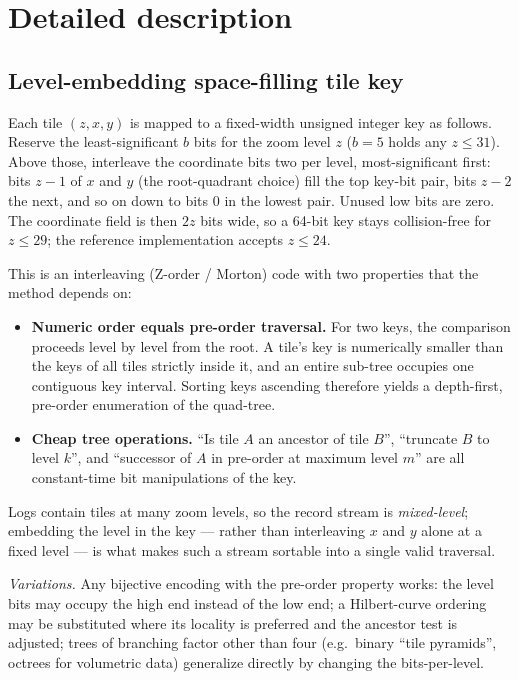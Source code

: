 \documentclass[10pt,twocolumn]{article}
\begin{document}
\section{Detailed description}

\subsection{Level-embedding space-filling tile key}

Each tile $(z, x, y)$ is mapped to a fixed-width unsigned integer key as
follows. Reserve the least-significant $b$ bits for the zoom level $z$
($b = 5$ holds any $z \le 31$). Above those, interleave the coordinate bits
two per level, most-significant first: bits $z - 1$ of $x$ and $y$ (the
root-quadrant choice) fill the top key-bit pair, bits $z - 2$ the next, and so
on down to bits $0$ in the lowest pair. Unused low bits are zero. The
coordinate field is then $2z$ bits wide, so a 64-bit key stays collision-free
for $z \le 29$; the reference implementation accepts $z \le 24$.

This is an interleaving (Z-order / Morton) code with two properties that the
method depends on:

\begin{itemize}
\item \textbf{Numeric order equals pre-order traversal.} For two keys, the
  comparison proceeds level by level from the root. A tile's key is numerically
  smaller than the keys of all tiles strictly inside it, and an entire sub-tree
  occupies one contiguous key interval. Sorting keys ascending therefore yields
  a depth-first, pre-order enumeration of the quad-tree.
\item \textbf{Cheap tree operations.} \enquote{Is tile $A$ an ancestor of tile
  $B$}, \enquote{truncate $B$ to level $k$}, and \enquote{successor of $A$ in
  pre-order at maximum level $m$} are all constant-time bit manipulations of
  the key.
\end{itemize}

Logs contain tiles at many zoom levels, so the record stream is
\emph{mixed-level}; embedding the level in the key --- rather than interleaving
$x$ and $y$ alone at a fixed level --- is what makes such a stream sortable
into a single valid traversal.

\emph{Variations.} Any bijective encoding with the pre-order property works:
the level bits may occupy the high end instead of the low end; a Hilbert-curve
ordering may be substituted where its locality is preferred and the ancestor
test is adjusted; trees of branching factor other than four (e.g.\ binary
\enquote{tile pyramids}, octrees for volumetric data) generalize directly by
changing the bits-per-level.
\end{document}
